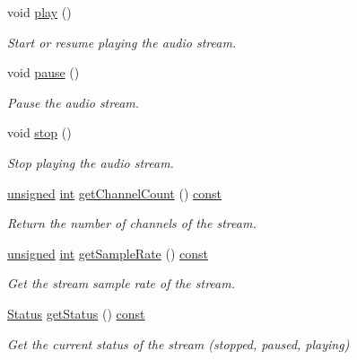 \begin{DoxyCompactItemize}
void \hyperlink{classsf_1_1_sound_stream_afdc08b69cab5f243d9324940a85a1144}{play} ()
\begin{DoxyCompactList}\small\item\em Start or resume playing the audio stream. \end{DoxyCompactList}\item 
void \hyperlink{classsf_1_1_sound_stream_a932ff181e661503cad288b4bb6fe45ca}{pause} ()
\begin{DoxyCompactList}\small\item\em Pause the audio stream. \end{DoxyCompactList}\item 
void \hyperlink{classsf_1_1_sound_stream_a16cc6a0404b32e42c4dce184bb94d0f4}{stop} ()
\begin{DoxyCompactList}\small\item\em Stop playing the audio stream. \end{DoxyCompactList}\item 
\hyperlink{curses_8priv_8h_aca40206900cfc164654362fa8d4ad1e6}{unsigned} \hyperlink{term__entry_8h_ad65b480f8c8270356b45a9890f6499ae}{int} \hyperlink{classsf_1_1_sound_stream_a68dedd0a2c26e6937c80fab3d235edea}{get\-Channel\-Count} () \hyperlink{term__entry_8h_a57bd63ce7f9a353488880e3de6692d5a}{const} 
\begin{DoxyCompactList}\small\item\em Return the number of channels of the stream. \end{DoxyCompactList}\item 
\hyperlink{curses_8priv_8h_aca40206900cfc164654362fa8d4ad1e6}{unsigned} \hyperlink{term__entry_8h_ad65b480f8c8270356b45a9890f6499ae}{int} \hyperlink{classsf_1_1_sound_stream_aad1da51c7a752682ca208bf11e3349bb}{get\-Sample\-Rate} () \hyperlink{term__entry_8h_a57bd63ce7f9a353488880e3de6692d5a}{const} 
\begin{DoxyCompactList}\small\item\em Get the stream sample rate of the stream. \end{DoxyCompactList}\item 
\hyperlink{classsf_1_1_sound_source_ac43af72c98c077500b239bc75b812f03}{Status} \hyperlink{classsf_1_1_sound_stream_a75f722e7edcfa9952ff0c643966c6858}{get\-Status} () \hyperlink{term__entry_8h_a57bd63ce7f9a353488880e3de6692d5a}{const} 
\begin{DoxyCompactList}\small\item\em Get the current status of the stream (stopped, paused, playing) \end{DoxyCompactList}\item 

\end{DoxyCompactItemize}
